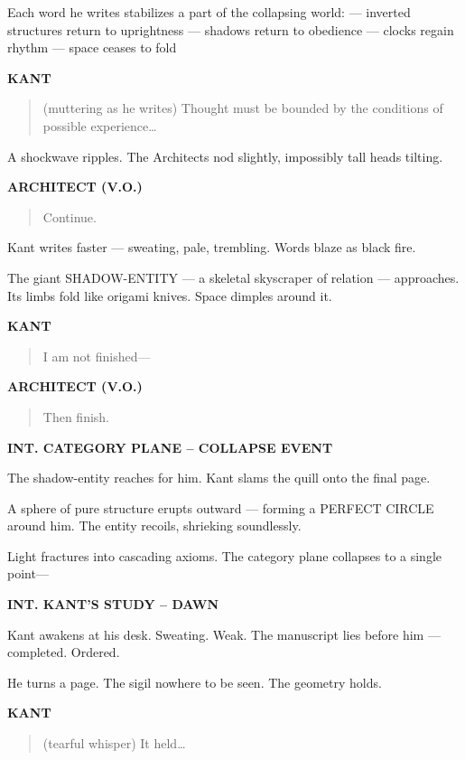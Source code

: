\documentclass[12pt]{article}
\newcommand{\Scene}[1]{\vspace{1.2em}\textbf{#1}\vspace{0.8em}}
\newcommand{\Character}[1]{\vspace{0.8em}\textbf{#1}\vspace{0.4em}}
\newenvironment{Dialogue}{\begin{quote}\begin{RaggedRight}}{\end{RaggedRight}\end{quote}}
\newcommand{\Action}[1]{\vspace{0.4em}#1\vspace{0.4em}}
\begin{document}
\Action{Each word he writes stabilizes a part of the collapsing world:  
— inverted structures return to uprightness  
— shadows return to obedience  
— clocks regain rhythm  
— space ceases to fold}

\Character{KANT}
\begin{Dialogue}
(muttering as he writes)  
Thought must be bounded  
by the conditions of possible experience…
\end{Dialogue}

\Action{A shockwave ripples.  
The Architects nod slightly,  
impossibly tall heads tilting.}

\Character{ARCHITECT (V.O.)}
\begin{Dialogue}
Continue.
\end{Dialogue}

\Action{Kant writes faster —  
sweating, pale, trembling.  
Words blaze as black fire.}

\Action{The giant SHADOW-ENTITY —  
a skeletal skyscraper of relation —  
approaches.  
Its limbs fold like origami knives.  
Space dimples around it.}

\Character{KANT}
\begin{Dialogue}
I am not finished—
\end{Dialogue}

\Character{ARCHITECT (V.O.)}
\begin{Dialogue}
Then finish.
\end{Dialogue}

\Scene{INT. CATEGORY PLANE – COLLAPSE EVENT}

\Action{The shadow-entity reaches for him.  
Kant slams the quill onto the final page.}

\Action{A sphere of pure structure erupts outward —  
forming a PERFECT CIRCLE around him.  
The entity recoils, shrieking soundlessly.}

\Action{Light fractures into cascading axioms.  
The category plane collapses to a single point—}

\Scene{INT. KANT’S STUDY – DAWN}

\Action{Kant awakens at his desk.  
Sweating.  
Weak.  
The manuscript lies before him —  
completed.  
Ordered.}

\Action{He turns a page.  
The sigil nowhere to be seen.  
The geometry holds.}

\Character{KANT}
\begin{Dialogue}
(tearful whisper)  
It held…
\end{Dialogue}
\end{document}
